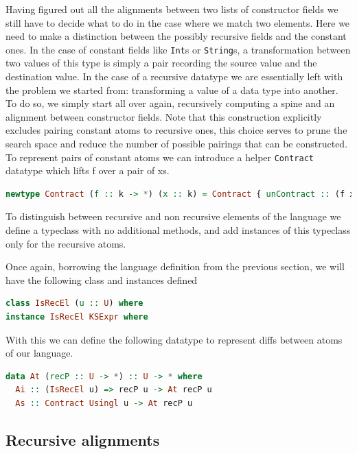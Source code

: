 \documentclass[11pt]{article}
\begin{document}
Having figured out all the alignments between two lists of constructor
fields we still have to decide what to do in the case where we match two
elements. Here we need to make a distinction between the possibly
recursive fields and the constant ones. In the case of constant fields
like \texttt{Int}s or \texttt{String}s, a transformation between two
values of this type is simply a pair recording the source value and the
destination value. In the case of a recursive datatype we are
essentially left with the problem we started from: transforming a value
of a data type into another. To do so, we simply start all over again,
recursively computing a spine and an alignment between constructor
fields. Note that this construction explicitly excludes pairing constant atoms 
to recursive ones, this choice serves to prune the search space and reduce the 
number of possible pairings that can be constructed.
\\
To represent pairs of constant atoms we can introduce a helper \texttt{Contract} datatype which 
lifts f over a pair of xs.

\begin{lstlisting}[language=haskell]
  newtype Contract (f :: k -> *) (x :: k) = Contract { unContract :: (f x , f x) }
\end{lstlisting}

To distinguish between recursive and non recursive elements of the language we 
define a typeclass with no additional methods, and add instances of this typeclass only for the recursive atoms.

Once again, borrowing the language definition from the previous section, we will have the following 
class and instances defined
\begin{lstlisting}[language=haskell]
class IsRecEl (u :: U) where
instance IsRecEl KSExpr where
\end{lstlisting}

With this we can define the following datatype to represent diffs between atoms of our language.
\begin{lstlisting}[language=haskell]
data At (recP :: U -> *) :: U -> * where
  Ai :: (IsRecEl u) => recP u -> At recP u
  As :: Contract Usingl u -> At recP u
\end{lstlisting}

\subsection{Recursive alignments}\label{recursive alignments}
\end{document}
